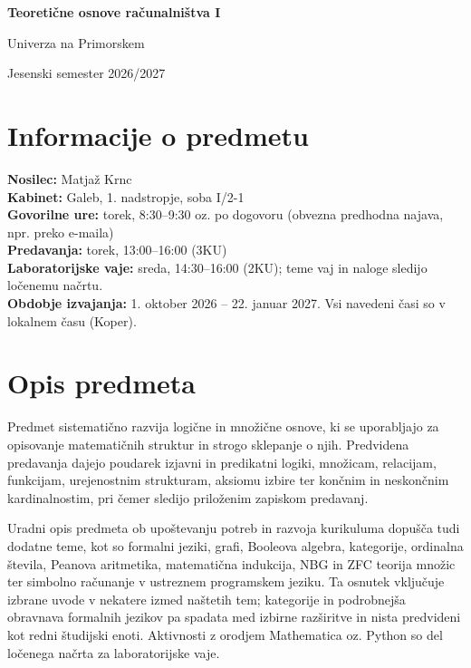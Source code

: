 \documentclass[11pt, a4paper]{article}
\begin{document}
\begin{center}
    {\huge\bfseries Teoretične osnove računalništva I \par}
    \vspace{0.5cm}
    {\Large Univerza na Primorskem \par}
    {\large Jesenski semester 2026/2027 \par}
\end{center}
\vspace{1cm}

\section*{Informacije o predmetu}

\textbf{Nosilec:} Matjaž Krnc\\
\textbf{Kabinet:} Galeb, 1. nadstropje, soba I/2-1 \\
\textbf{Govorilne ure:} torek, 8:30–9:30 oz. po dogovoru (obvezna predhodna najava, npr. preko e-maila)\\
\textbf{Predavanja:} torek, 13:00–16:00 (3KU) \\
\textbf{Laboratorijske vaje:} sreda, 14:30–16:00 (2KU); teme vaj in naloge sledijo ločenemu načrtu. \\
\textbf{Obdobje izvajanja:} 1. oktober 2026 – 22. januar 2027. Vsi navedeni časi so v lokalnem času (Koper).

\section*{Opis predmeta}

Predmet sistematično razvija logične in množične osnove, ki se uporabljajo za opisovanje matematičnih struktur in strogo sklepanje o njih. Predvidena predavanja dajejo poudarek izjavni in predikatni logiki, množicam, relacijam, funkcijam, urejenostnim strukturam, aksiomu izbire ter končnim in neskončnim kardinalnostim, pri čemer sledijo priloženim zapiskom predavanj.

Uradni opis predmeta ob upoštevanju potreb in razvoja kurikuluma dopušča tudi dodatne teme, kot so formalni jeziki, grafi, Booleova algebra, kategorije, ordinalna števila, Peanova aritmetika, matematična indukcija, NBG in ZFC teorija množic ter simbolno računanje v ustreznem programskem jeziku. Ta osnutek vključuje izbrane uvode v nekatere izmed naštetih tem; kategorije in podrobnejša obravnava formalnih jezikov pa spadata med izbirne razširitve in nista predvideni kot redni študijski enoti. Aktivnosti z orodjem Mathematica oz. Python so del ločenega načrta za laboratorijske vaje.
\end{document}
